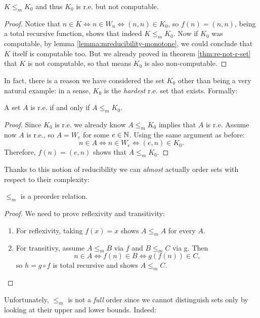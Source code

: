 \documentclass[../main.tex]{memoir}
\begin{document}
\begin{lemma}
  \label{lemma:k-m-red-k0}
  $K \le_m K_0$ and thus $K_0$ is r.e. but not computable.
\end{lemma}
\begin{proof}
  Notice that $n \in K \iff n \in W_n \iff (n, n) \in K_0$, so $f(n) = (n, n)$, being a total recursive function, shows that indeed $K \le_m K_0$. Now if $K_0$ was computable, by lemma \ref{lemma:mreducibility-monotone}, we could conclude that $K$ itself is computable too. But we already proved in theorem \ref{thm:re-not-r-set} that $K$ is not computable, so that means $K_0$ is also non-computable.
\end{proof}

In fact, there is a reason we have considered the set $K_0$ other than being a very natural example: in a sense, $K_0$ is the \textit{hardest} r.e. set that exists. Formally:

\begin{lemma}
  \label{lemma:k0-complete}
  A set $A$ is r.e. if and only if $A \le_m K_0$.
\end{lemma}
\begin{proof}
  Since $K_0$ is r.e. we already know $A \le_m K_0$ implies that $A$ is r.e. Assume now $A$ is r.e., so $A = W_e$ for some $e \in \mathbb{N}$. Using the same argument as before:
  \[ n \in A \iff n \in W_e \iff (e, n) \in K_0. \]
  Therefore, $f(n) = (e, n)$ shows that $A \le_m K_0$.
\end{proof}

Thanks to this notion of reducibility we can \textit{almost} actually order sets with respect to their complexity:

\begin{lemma}
  \label{lemma:m-red-preorder}
  $\le_m$ is a preorder relation.
\end{lemma}
\begin{proof}
  We need to prove reflexivity and transitivity:
  \begin{enumerate}
  \item For reflexivity, taking $f(x) = x$ shows $A \le_m A$ for every $A$.
  \item For transitivy, assume $A \le_m B$ via $f$ and $B \le_m C$ via g. Then
    \[ n \in A \iff f(n) \in B \iff g(f(n)) \in C, \]
    so $h = g \circ f$ is total recursive and shows $A \le_m C$.
  \end{enumerate}
\end{proof}

Unfortunately, $\le_m$ is not a \textit{full} order since we cannot distinguish sets only by looking at their upper and lower bounds. Indeed:
\end{document}
